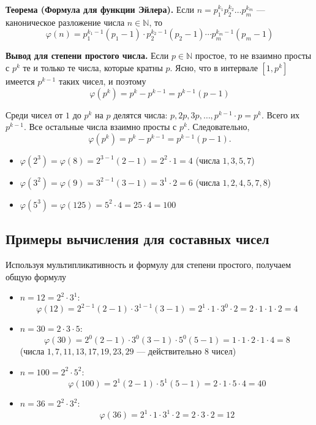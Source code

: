 \documentclass[a4paper,12pt]{article}
\theoremstyle{definition}
\theoremstyle{plain}
\theoremstyle{remark}
\begin{document}
	\noindent \textbf{Теорема (Формула для функции Эйлера).}
	Если $n = p_1^{k_1} p_2^{k_2} \dots p_m^{k_m}$ — каноническое разложение числа $n \in \mathbb{N}$, то
	\[
	\varphi(n) = p_1^{k_1-1}(p_1 - 1) \cdot p_2^{k_2-1}(p_2 - 1) \cdots p_m^{k_m-1}(p_m - 1)
	\]
	
	\medskip
	\noindent \textbf{Вывод для степени простого числа.}
	Если $p \in \mathbb{N}$ простое, то не взаимно просты с $p^k$ те и только те числа, которые кратны $p$. Ясно, что в интервале $[1, p^k]$ имеется $p^{k-1}$ таких чисел, и поэтому
	\[
	\varphi(p^k) = p^k - p^{k-1} = p^{k-1}(p - 1)
	\]
	
	\begin{tcolorbox}[colback=red!5, colframe=red!70!black, title=Доказательство для степени простого]
		Среди чисел от $1$ до $p^k$ на $p$ делятся числа: $p, 2p, 3p, \dots, p^{k-1} \cdot p = p^k$. Всего их $p^{k-1}$. Все остальные числа взаимно просты с $p^k$. Следовательно,
		\[
		\varphi(p^k) = p^k - p^{k-1} = p^{k-1}(p-1).
		\]
	\end{tcolorbox}
	
	\begin{tcolorbox}[colback=blue!5, colframe=blue!40!black, title=Примеры]
		\begin{itemize}
			\item $\varphi(2^3) = \varphi(8) = 2^{3-1}(2-1) = 2^2 \cdot 1 = 4$ (числа $1,3,5,7$)
			\item $\varphi(3^2) = \varphi(9) = 3^{2-1}(3-1) = 3^1 \cdot 2 = 6$ (числа $1,2,4,5,7,8$)
			\item $\varphi(5^3) = \varphi(125) = 5^{2} \cdot 4 = 25 \cdot 4 = 100$
		\end{itemize}
	\end{tcolorbox}
	
	\subsection{Примеры вычисления для составных чисел}
	
	Используя мультипликативность и формулу для степени простого, получаем общую формулу
	
	\begin{tcolorbox}[colback=gray!5, colframe=gray!50, title=Примеры]
		\begin{itemize}
			\item $n = 12 = 2^2 \cdot 3^1$:
			\[
			\varphi(12) = 2^{2-1}(2-1) \cdot 3^{1-1}(3-1) = 2^1 \cdot 1 \cdot 3^0 \cdot 2 = 2 \cdot 1 \cdot 1 \cdot 2 = 4
			\]
			\item $n = 30 = 2 \cdot 3 \cdot 5$:
			\[
			\varphi(30) = 2^{0}(2-1) \cdot 3^{0}(3-1) \cdot 5^{0}(5-1) = 1 \cdot 1 \cdot 2 \cdot 1 \cdot 4 = 8
			\]
			(числа $1,7,11,13,17,19,23,29$ — действительно 8 чисел)
			\item $n = 100 = 2^2 \cdot 5^2$:
			\[
			\varphi(100) = 2^{1}(2-1) \cdot 5^{1}(5-1) = 2 \cdot 1 \cdot 5 \cdot 4 = 40
			\]
			\item $n = 36 = 2^2 \cdot 3^2$:
			\[
			\varphi(36) = 2^{1} \cdot 1 \cdot 3^{1} \cdot 2 = 2 \cdot 3 \cdot 2 = 12
			\]
		\end{itemize}
	\end{tcolorbox}
	
\end{document}
